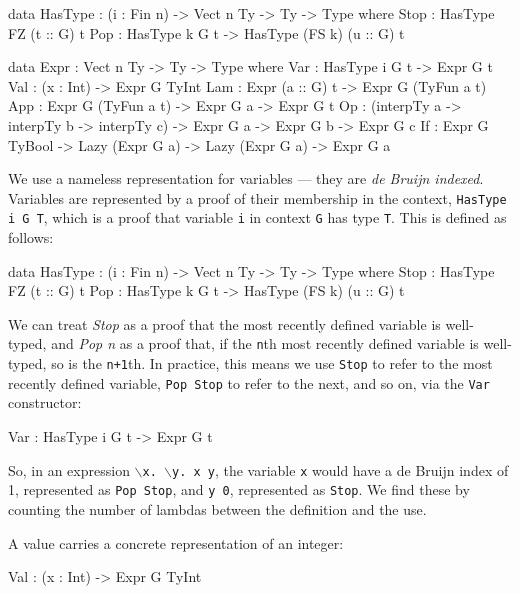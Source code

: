 \begin{code}[caption={Expression representation},label=exprty, float=htp]
data HasType : (i : Fin n) -> Vect n Ty -> Ty -> Type where
    Stop : HasType FZ (t :: G) t
    Pop  : HasType k G t -> HasType (FS k) (u :: G) t

data Expr : Vect n Ty -> Ty -> Type where
    Var : HasType i G t -> Expr G t
    Val : (x : Int) -> Expr G TyInt
    Lam : Expr (a :: G) t -> Expr G (TyFun a t)
    App : Expr G (TyFun a t) -> Expr G a -> Expr G t
    Op  : (interpTy a -> interpTy b -> interpTy c) -> Expr G a ->
          Expr G b -> Expr G c
    If  : Expr G TyBool -> Lazy (Expr G a) -> Lazy (Expr G a) -> Expr G a
\end{code}

\noindent
We use a nameless representation for variables --- they are \emph{de Bruijn indexed}.
Variables are represented by a proof of their membership in the context, \texttt{HasType i G T}, which is a proof that variable \texttt{i} in context  \texttt{G} has type \texttt{T}. This is defined as follows:

\begin{code}
data HasType : (i : Fin n) -> Vect n Ty -> Ty -> Type where
    Stop : HasType FZ (t :: G) t
    Pop  : HasType k G t -> HasType (FS k) (u :: G) t
\end{code}

\noindent
We can treat \emph{Stop} as a proof that the most recently defined variable is well-typed, and \emph{Pop n} as a proof that, if the \texttt{n}th most recently defined variable is well-typed, so is the \texttt{n+1}th.
In practice, this means we use \texttt{Stop} to refer to the most recently defined variable, \texttt{Pop Stop} to refer to the next, and so on, via the \texttt{Var} constructor:

\begin{code}
Var : HasType i G t -> Expr G t
\end{code}

\noindent
So, in an expression \texttt{$\backslash$x. $\backslash$y. x y},  the variable \texttt{x} would have a de Bruijn index of 1, represented as \texttt{Pop Stop}, and \texttt{y 0}, represented as \texttt{Stop}.
We find these by counting the number of lambdas between the definition and the use.

\noindent
A value carries a concrete representation of an integer:

\begin{code}
Val : (x : Int) -> Expr G TyInt
\end{code}

